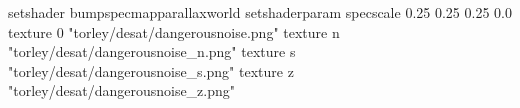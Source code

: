 setshader bumpspecmapparallaxworld
setshaderparam specscale 0.25 0.25 0.25 0.0
texture 0 "torley/desat/dangerousnoise.png"
texture n "torley/desat/dangerousnoise_n.png"
texture s "torley/desat/dangerousnoise_s.png"
texture z "torley/desat/dangerousnoise_z.png"


